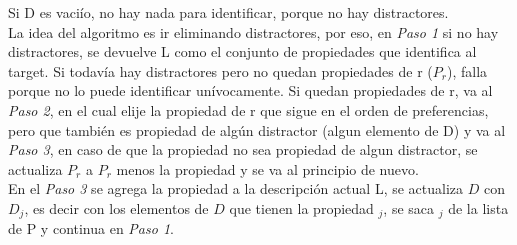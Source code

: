 Si D es vaci\'io, no hay nada para identificar, porque no hay distractores.\\

La idea del algoritmo es ir eliminando distractores, por eso, en {\it Paso 1} si no hay distractores, se devuelve L como el conjunto de propiedades que identifica al target. Si todav\'ia hay distractores pero no quedan propiedades de r ($P_{r}$), falla porque no lo puede identificar un\'ivocamente. Si quedan propiedades de r, va al {\it Paso 2}, en el cual elije la propiedad de r que sigue en el orden de preferencias, pero que tambi\'en es propiedad de alg\'un distractor (algun elemento de D) y va al {\it Paso 3}, en caso de que la propiedad no sea propiedad de algun distractor, se actualiza $P_{r}$ a $P_{r}$ menos la propiedad y se va al principio de nuevo.\\
En el {\it Paso 3} se agrega la propiedad a la descripci\'on actual L, se actualiza $D$ con $D_{j}$, es decir con los elementos de $D$ que tienen la propiedad $_j$, se saca $_j$ de la lista de P y continua en {\it Paso 1}.\\

